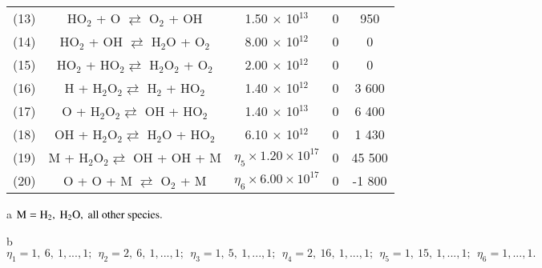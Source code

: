 \documentclass{warpdoc}
\begin{document}
\begin{table}[t]
\begin{center}
\begin{threeparttable}
\begin{tabular}{ccccc}
(13) & HO$_{2}$ + O $\rightleftarrows$ O$_{2}$ + OH & 1.50 $\times$ 10$^{13}$ & 0 &  950 \\
(14) & HO$_{2}$ + OH $\rightleftarrows$ H$_{2}$O + O$_{2}$ & 8.00 $\times$ 10$^{12}$ & 0 & 0 \\
(15) & HO$_{2}$ + HO$_{2} \rightleftarrows$ H$_{2}$O$_{2}$ + O$_{2}$ & 2.00 $\times$ 10$^{12}$ & 0 & 0 \\
(16) & H + H$_{2}$O$_{2} \rightleftarrows$ H$_{2}$ + HO$_{2}$ & 1.40 $\times$ 10$^{12}$ & 0 & 3 600 \\
(17) & O + H$_{2}$O$_{2} \rightleftarrows$ OH + HO$_{2}$ & 1.40 $\times$ 10$^{13}$ & 0 & 6 400 \\
(18) & OH + H$_{2}$O$_{2} \rightleftarrows$ H$_{2}$O + HO$_{2}$ & 6.10 $\times$ 10$^{12}$ & 0 & 1 430 \\
(19) & M + H$_{2}$O$_{2} \rightleftarrows$ OH + OH + M & $\eta_5 \times 1.20 \times 10^{17}$ & 0 & 45 500 \\
(20) & O + O + M $\rightleftarrows$ O$_{2}$ + M & $\eta_6 \times 6.00 \times 10^{17}$ & 0 & -1 800 \\
\bottomrule
\end{tabular}
\begin{tablenotes}
\item[{a}] $\rm M=H_2,~H_2 O,~all~other~species.$
\item[{b}] $\eta_1=1,~6,~1,...,1;~~\eta_2=2,~6,~1,...,1;~~\eta_3=1,~5,~1,...,1;~~\eta_4=2,~16,~1,...,1;~~\eta_5=1,~15,~1,...,1;~~\eta_6=1,...,1.$
\end{tablenotes}
\label{tab:jachimowski}
\end{threeparttable}
\end{center}
\end{table}
%








~
\newpage
~
\newpage
~
\newpage
~
\newpage





\end{document}
